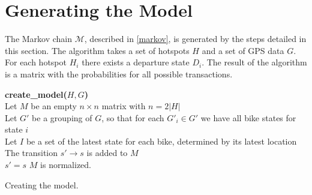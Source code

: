 \section{Generating the Model}\label{sec:generatemarkov}
The Markov chain $\mathcal{M}$, described in \cref{markov}, is generated by the steps detailed in this section.
The algorithm takes a set of hotspots $H$ and a set of GPS data $G$. For each hotspot $H_i$ there exists a departure state $D_i$.
The result of the algorithm is a matrix with the probabilities for all possible transactions.

\begin{algorithm}[H]
\textbf{create\_model($H, G$)} \\
Let $M$ be an empty $n \times n$ matrix with $n = 2|H|$ \\
Let $G'$ be a grouping of $G$, so that for each $G'_i \in G'$ we have all bike states for state $i$\\
Let $I$ be a set of the latest state for each bike, determined by its latest location\\
  {
    {The transition $s' \rightarrow s$ is added to $M$\\
     $s' = s$}}
$M$ is normalized.\\
\caption{Creating the model.}
\label{markov:create_model}
\end{algorithm}
